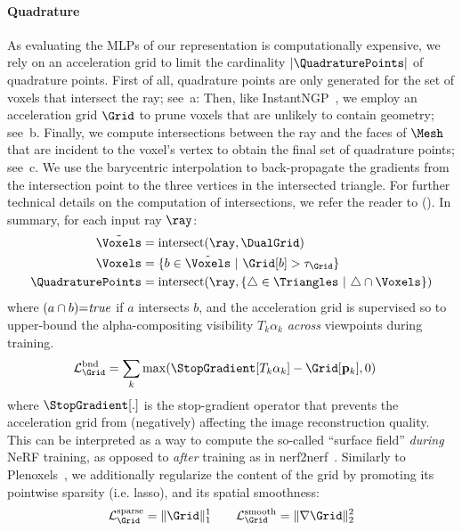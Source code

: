 \paragraph{Quadrature}
As evaluating the MLPs of our representation is computationally expensive, we rely on an acceleration grid to limit the cardinality $|\QuadraturePoints|$ of quadrature points.
First of all, quadrature points are only generated for the set of voxels that intersect the ray; see~a:
Then, like InstantNGP~\cite{mueller2022instant}, we employ an acceleration grid $\Grid$ to prune voxels that are unlikely to contain geometry; see~b.
Finally, we compute intersections between the ray and the faces of $\Mesh$ that are incident to the voxel's vertex to obtain the final set of quadrature points; see~c.
We use the barycentric interpolation to back-propagate the gradients from the intersection point to the three vertices in the intersected triangle.
For further technical details on the computation of intersections, we refer the reader to \SupplementaryMaterial ().
In summary, for each input ray $\ray$:
\begin{align}
\tilde\Voxels &= \text{intersect}(\ray, \DualGrid)
\label{eq:ray_voxel_intersection}
\\
\Voxels &= \{ b \in \tilde\Voxels ~|~ \Grid[b] > \tau_\Grid \}
\label{eq:acceleration}
\\
\QuadraturePoints &= \text{intersect}(\ray, \{ \triangle \in \Triangles ~|~ \triangle \cap \Voxels \})
\label{eq:ray_meshface_intersection}
\end{align}
where $(a\cap b){=}\text{\textit{true}}$ if $a$ intersects $b$, and the acceleration grid is supervised so to upper-bound\upperboundfootnote{} the alpha-compositing visibility $T_k \alpha_k$ \textit{across} viewpoints during training.
\begin{align}
\mathcal{L}_\Grid^\text{bnd} &= \sum_k \max( \StopGradient[T_k \alpha_k] - \Grid[\mathbf{p}_k] ,0)
\end{align}
where $\StopGradient[.]$ is the stop-gradient operator that prevents the acceleration grid from (negatively) affecting the image reconstruction quality.
This can be interpreted as a way to compute the so-called ``surface field'' \textit{during} NeRF training, as opposed to \textit{after} training as in nerf2nerf~\cite{nerf2nerf}.
Similarly to Plenoxels~\cite{plenoxels}, we additionally regularize the content of the grid by promoting its pointwise sparsity (i.e. lasso), and its spatial smoothness:
\begin{align}
\mathcal{L}_\Grid^\text{sparse} = \| \Grid \|_1^1
\quad \quad
\mathcal{L}_\Grid^\text{smooth} = \| \nabla \Grid \|_2^2
\end{align}



